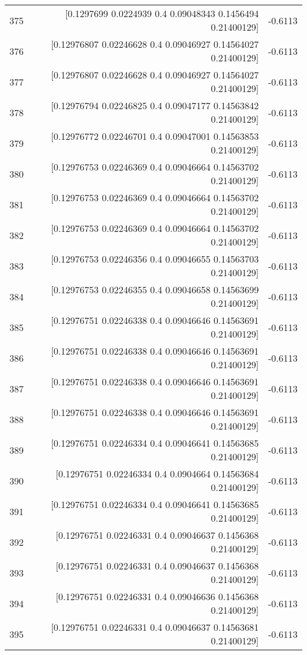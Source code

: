\begin{longtable}{lrr}
375 & [0.1297699  0.0224939  0.4        0.09048343 0.1456494  0.21400129] & -0.6113 \\
376 & [0.12976807 0.02246628 0.4        0.09046927 0.14564027 0.21400129] & -0.6113 \\
377 & [0.12976807 0.02246628 0.4        0.09046927 0.14564027 0.21400129] & -0.6113 \\
378 & [0.12976794 0.02246825 0.4        0.09047177 0.14563842 0.21400129] & -0.6113 \\
379 & [0.12976772 0.02246701 0.4        0.09047001 0.14563853 0.21400129] & -0.6113 \\
380 & [0.12976753 0.02246369 0.4        0.09046664 0.14563702 0.21400129] & -0.6113 \\
381 & [0.12976753 0.02246369 0.4        0.09046664 0.14563702 0.21400129] & -0.6113 \\
382 & [0.12976753 0.02246369 0.4        0.09046664 0.14563702 0.21400129] & -0.6113 \\
383 & [0.12976753 0.02246356 0.4        0.09046655 0.14563703 0.21400129] & -0.6113 \\
384 & [0.12976753 0.02246355 0.4        0.09046658 0.14563699 0.21400129] & -0.6113 \\
385 & [0.12976751 0.02246338 0.4        0.09046646 0.14563691 0.21400129] & -0.6113 \\
386 & [0.12976751 0.02246338 0.4        0.09046646 0.14563691 0.21400129] & -0.6113 \\
387 & [0.12976751 0.02246338 0.4        0.09046646 0.14563691 0.21400129] & -0.6113 \\
388 & [0.12976751 0.02246338 0.4        0.09046646 0.14563691 0.21400129] & -0.6113 \\
389 & [0.12976751 0.02246334 0.4        0.09046641 0.14563685 0.21400129] & -0.6113 \\
390 & [0.12976751 0.02246334 0.4        0.0904664  0.14563684 0.21400129] & -0.6113 \\
391 & [0.12976751 0.02246334 0.4        0.09046641 0.14563685 0.21400129] & -0.6113 \\
392 & [0.12976751 0.02246331 0.4        0.09046637 0.1456368  0.21400129] & -0.6113 \\
393 & [0.12976751 0.02246331 0.4        0.09046637 0.1456368  0.21400129] & -0.6113 \\
394 & [0.12976751 0.02246331 0.4        0.09046636 0.1456368  0.21400129] & -0.6113 \\
395 & [0.12976751 0.02246331 0.4        0.09046637 0.14563681 0.21400129] & -0.6113 \\

\end{longtable}
